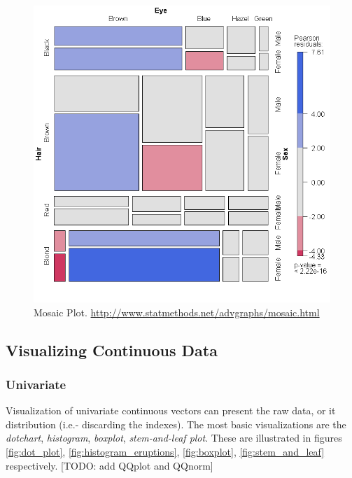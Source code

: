 \begin{figure}[h]
\centering
\includegraphics[height=0.3\textheight]{art/mosaic1}
\caption[Mosaic Plot]{Mosaic Plot. \newline
\url{http://www.statmethods.net/advgraphs/mosaic.html}}
\label{fig:mosaic}
\end{figure}







\afterpage{\clearpage}


\subsection{Visualizing Continuous Data}




\subsubsection{Univariate}
Visualization of univariate continuous vectors can present the raw data, or it distribution (i.e.- discarding the indexes).
The most basic visualizations are the \emph{dotchart}, \emph{histogram}, \emph{boxplot}, \emph{stem-and-leaf plot}. 
These are illustrated in figures \ref{fig:dot_plot}, \ref{fig:histogram_eruptions}, \ref{fig:boxplot}, \ref{fig:stem_and_leaf} respectively. 
[TODO: add QQplot and QQnorm]

